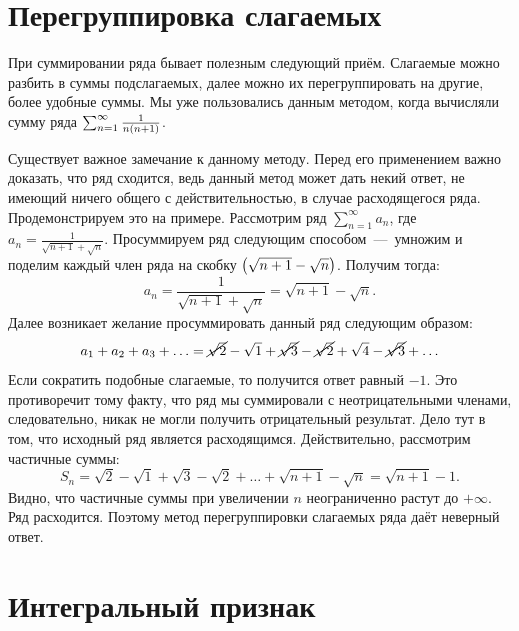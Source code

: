 \documentclass[12pt]{article}
\begin{document}
\section{Перегруппировка слагаемых}
При суммировании ряда бывает полезным следующий приём. Слагаемые можно разбить в суммы подслагаемых, далее можно их перегруппировать на другие, более удобные суммы. Мы уже пользовались данным методом, когда вычисляли сумму ряда $\sum_{n=1}^\infty \tfrac{1}{n\qty(n+1)}$.
\par
Существует важное замечание к данному методу. Перед его применением важно доказать, что ряд сходится, ведь данный метод может дать некий ответ, не имеющий ничего общего с действительностью, в случае расходящегося ряда. Продемонстрируем это на примере. Рассмотрим ряд $\sum_{n=1}^\infty a_n$, где $a_n = \tfrac{1}{\sqrt{n+1} + \sqrt{n}}$. Просуммируем ряд следующим способом~\----~умножим и поделим каждый член ряда на скобку $\qty(\sqrt{n+1} - \sqrt{n})$. Получим тогда:
\begin{equation}
    a_n = \dfrac{1}{\sqrt{n+1} + \sqrt{n}} = \sqrt{n+1} - \sqrt{n}.
\end{equation}
Далее возникает желание просуммировать данный ряд следующим образом:
\begin{equation}
    a_1+a_2+a_3+\ldots = \cancel{\sqrt{2}} - \sqrt{1} + \cancel{\sqrt{3}} - \cancel{\sqrt{2}} +\sqrt{4} - \cancel{\sqrt{3}} + \ldots
\end{equation}
Если сократить подобные слагаемые, то получится ответ равный $-1$. Это противоречит тому факту, что ряд мы суммировали с неотрицательными членами, следовательно, никак не могли получить отрицательный результат. Дело тут в том, что исходный ряд является расходящимся. Действительно, рассмотрим частичные суммы:
\begin{equation}
    S_n = \sqrt{2} - \sqrt{1} + \sqrt{3} - \sqrt{2} + \ldots + \sqrt{n+1} - \sqrt{n} = \sqrt{n+1} -1.
\end{equation}
Видно, что частичные суммы при увеличении $n$ неограниченно растут до $+\infty$. Ряд расходится. Поэтому метод перегруппировки слагаемых ряда даёт неверный ответ.
\section{Интегральный признак}
\end{document}
